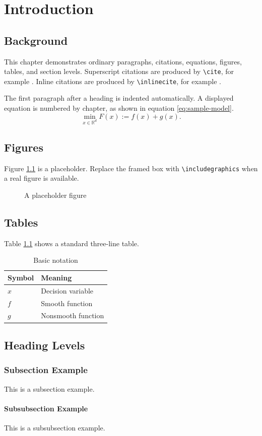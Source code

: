 \chapter{Introduction}

\section{Background}

This chapter demonstrates ordinary paragraphs, citations, equations, figures, tables, and section levels. Superscript citations are produced by \verb|\cite|, for example \cite{sample-journal}. Inline citations are produced by \verb|\inlinecite|, for example .

The first paragraph after a heading is indented automatically. A displayed equation is numbered by chapter, as shown in equation \eqref{eq:sample-model}.
\begin{equation}\label{eq:sample-model}
  \min_{x\in\mathbb{R}^{d}} F(x):=f(x)+g(x).
\end{equation}

\section{Figures}

Figure \ref{fig:placeholder} is a placeholder. Replace the framed box with \verb|\includegraphics| when a real figure is available.
\begin{figure}[htbp]
  \centering
  \fbox{\rule{0pt}{35mm}\rule{80mm}{0pt}}
  \caption{A placeholder figure}
  \label{fig:placeholder}
\end{figure}

\section{Tables}

Table \ref{tab:notation} shows a standard three-line table.
\begin{table}[htbp]
  \centering
  \caption{Basic notation}
  \label{tab:notation}
  \begin{tabular}{ll}
    \toprule
    Symbol & Meaning \\
    \midrule
    $x$ & Decision variable \\
    $f$ & Smooth function \\
    $g$ & Nonsmooth function \\
    \bottomrule
  \end{tabular}
\end{table}

\section{Heading Levels}

\subsection{Subsection Example}

This is a subsection example.

\subsubsection{Subsubsection Example}

This is a subsubsection example.
